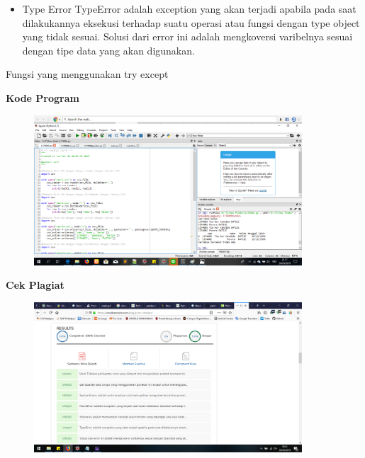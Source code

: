 \begin{enumerate}
\begin{itemize}
		\item Type Error
		TypeError adalah exception yang akan terjadi apabila pada saat dilakukannya eksekusi terhadap suatu operasi atau fungsi dengan type object yang tidak sesuai. Solusi dari error ini adalah mengkoversi varibelnya sesuai dengan tipe data yang akan digunakan.
	\end{itemize}
	
	Fungsi yang menggunakan try except
	
\end{enumerate}

\textbf{Kode Program}
\begin{figure}[H]
	\includegraphics[width=10cm]{figures/4/1174086/p1.png}
	\centering
\end{figure}

\textbf{Cek Plagiat}
\begin{figure}[H]
	\includegraphics[width=10cm]{figures/4/1174086/plagiatpenanganan.png}
	\centering
\end{figure}
